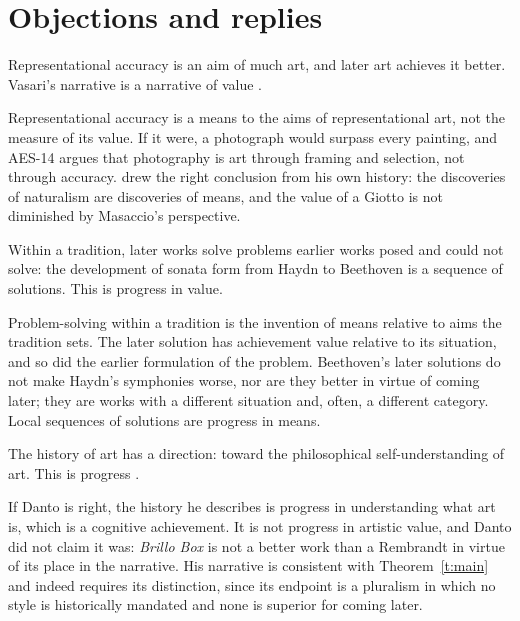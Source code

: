 \documentclass{situationist-preprint}
\begin{document}
\section{Objections and replies}

\begin{objection}[Mimesis]\label{o:mimesis}
Representational accuracy is an aim of much art, and later art achieves it better. Vasari's narrative is a narrative of value \citep{Vasari1568}.
\end{objection}

\begin{reply}
Representational accuracy is a means to the aims of representational art, not the measure of its value. If it were, a photograph would surpass every painting, and AES-14 argues that photography is art through framing and selection, not through accuracy. \citet{Gombrich1960} drew the right conclusion from his own history: the discoveries of naturalism are discoveries of means, and the value of a Giotto is not diminished by Masaccio's perspective.
\end{reply}

\begin{objection}\label{o:local}
Within a tradition, later works solve problems earlier works posed and could not solve: the development of sonata form from Haydn to Beethoven is a sequence of solutions. This is progress in value.
\end{objection}

\begin{reply}
Problem-solving within a tradition is the invention of means relative to aims the tradition sets. The later solution has achievement value relative to its situation, and so did the earlier formulation of the problem. Beethoven's later solutions do not make Haydn's symphonies worse, nor are they better in virtue of coming later; they are works with a different situation and, often, a different category. Local sequences of solutions are progress in means.
\end{reply}

\begin{objection}[Danto]\label{o:danto}
The history of art has a direction: toward the philosophical self-understanding of art. This is progress \citep{Danto1984}.
\end{objection}

\begin{reply}
If Danto is right, the history he describes is progress in understanding what art is, which is a cognitive achievement. It is not progress in artistic value, and Danto did not claim it was: \emph{Brillo Box} is not a better work than a Rembrandt in virtue of its place in the narrative. His narrative is consistent with Theorem~\ref{t:main} and indeed requires its distinction, since its endpoint is a pluralism in which no style is historically mandated and none is superior for coming later.
\end{reply}
\end{document}
